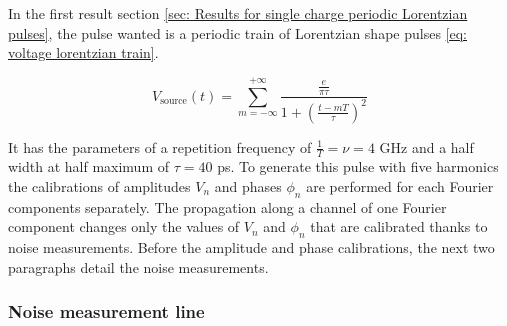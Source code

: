 In the first result section \ref{sec: Results for single charge periodic Lorentzian pulses}, the pulse wanted is a periodic train of Lorentzian shape pulses \eqref{eq: voltage lorentzian train}.

\begin{equation}
V_{\mathrm{source}}\left(t\right) = \sum_{m = -\infty}^{+\infty} \frac{\frac{e}{\pi\tau}}{1+\left(\frac{t-mT}{\tau}\right)^{2}} \label{eq: voltage lorentzian train}
\end{equation}

It has the parameters of a repetition frequency of $\frac{1}{T} = \nu = 4$ GHz and a half width at half maximum of $\tau = 40$ ps. 
To generate this pulse with five harmonics the calibrations of amplitudes $V_{n}$ and phases $\phi_{n}$ are performed for each Fourier components separately.
The propagation along a channel of one Fourier component changes only the values of $V_{n}$ and $\phi_{n}$ \cite{bocquillon2013separation} that are calibrated thanks to noise measurements.
Before the amplitude and phase calibrations, the next two paragraphs detail the noise measurements.



\subsubsection*{Noise measurement line}

